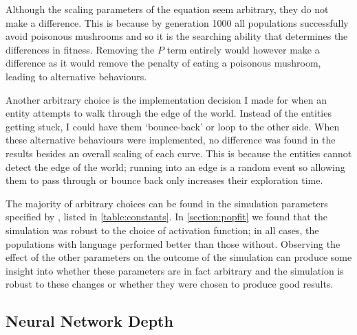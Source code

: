 \documentclass[12pt,a4paper]{report}
\begin{document}
Although the scaling parameters of the equation seem arbitrary, they do not make a difference. This is because by generation 1000 all populations successfully avoid poisonous mushrooms and so it is the searching ability that determines the differences in fitness. Removing the $P$ term entirely would however make a difference as it would remove the penalty of eating a poisonous mushroom, leading to alternative behaviours.

Another arbitrary choice is the implementation decision I made for when an entity attempts to walk through the edge of the world. Instead of the entities getting stuck, I could have them `bounce-back' or loop to the other side. When these alternative behaviours were implemented, no difference was found in the results besides an overall scaling of each curve. This is because the entities cannot detect the edge of the world; running into an edge is a random event so allowing them to pass through or bounce back only increases their exploration time.

The majority of arbitrary choices can be found in the simulation parameters specified by \citet{Cangelosi1998}, listed in \cref{table:constants}. In \cref{section:popfit} we found that the simulation was robust to the choice of activation function; in all cases, the populations with language performed better than those without. Observing the effect of the other parameters on the outcome of the simulation can produce some insight into whether these parameters are in fact arbitrary and the simulation is robust to these changes or whether they were chosen to produce good results. %

\subsection{Neural Network Depth}
\end{document}
